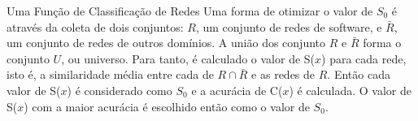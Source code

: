 \begin{section}{Uma Função de Classificação de Redes}
Uma forma de otimizar o valor de $S_0$ é através da coleta de dois conjuntos: $R$, um conjunto de redes de software, e $\bar{R}$, um conjunto de redes de outros domínios. A união dos conjunto $R$ e $\bar{R}$ forma o conjunto $U$, ou universo. Para tanto, é calculado o valor de S($x$) para cada rede, isto é, a similaridade média entre cada de $R \cap \bar{R}$ e as redes de $R$. Então cada valor de S($x$) é considerado como $S_0$ e a acurácia de C($x$) é calculada. O valor de S($x$) com a maior acurácia é escolhido então como o valor de $S_0$.

% 
% 
\end{section}

